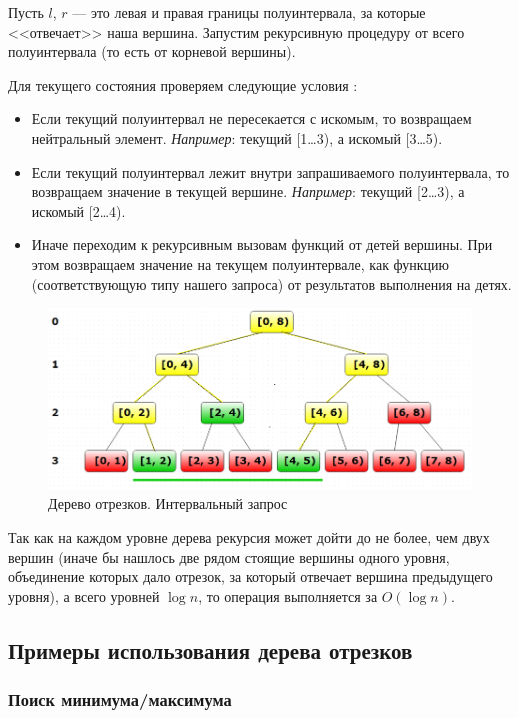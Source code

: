 Пусть $l$, $r$ — это левая и правая границы полуинтервала, за которые <<отвечает>> наша вершина. Запустим рекурсивную процедуру от всего полуинтервала (то есть от корневой вершины).

Для текущего состояния проверяем следующие условия :
\begin{itemize}
    \item Если текущий полуинтервал не пересекается с искомым, то возвращаем нейтральный элемент.
    \textit{Например}: текущий [1…3), а искомый [3…5).
    \item Если текущий полуинтервал лежит внутри запрашиваемого полуинтервала, то возвращаем значение в текущей вершине.
    \textit{Например}: текущий [2…3), а искомый [2…4).
    \item Иначе переходим к рекурсивным вызовам функций от детей вершины. При этом возвращаем значение на текущем полуинтервале, как функцию (соответствующую типу нашего запроса) от результатов выполнения на детях.
\end{itemize}

\begin{figure}
\centering
\includegraphics[scale=0.7]{images/SegmentTreeQueryTB.png}
\caption{Дерево отрезков. Интервальный запрос}
\label{fig:segment_tree_interval}
\end{figure}

Так как на каждом уровне дерева рекурсия может дойти до не более, чем двух вершин (иначе бы нашлось две рядом стоящие вершины одного уровня, объединение которых дало отрезок, за который отвечает вершина предыдущего уровня), а всего уровней $\log n$, то операция выполняется за $O(\log n)$.

\subsection{Примеры использования дерева отрезков}

\subsubsection{Поиск минимума/максимума}


